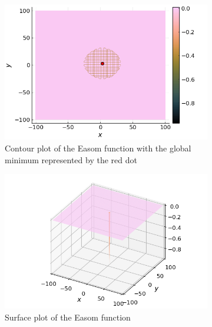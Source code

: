   \begin{figure}[ht!]
    \centering
    \begin{subfigure}[b]{0.45\textwidth}
      \centering
      \includegraphics[width=\textwidth]{img/test_functions/easom_contour.png}
      \caption{
        Contour plot of the Easom function with the global minimum represented by 
        the red dot
      }
      \label{fig:app:test:easom:contour}
    \end{subfigure}
    \hfill
    \begin{subfigure}[b]{0.45\textwidth}
      \centering
      \includegraphics[width=\textwidth]{img/test_functions/easom_surface.png}
      \caption{Surface plot of the Easom function}
      \label{fig:app:test:easom:surface}
    \end{subfigure}
    \begin{subfigure}[b]{0.45\textwidth}
      \centering

\end{subfigure}
\end{figure}
